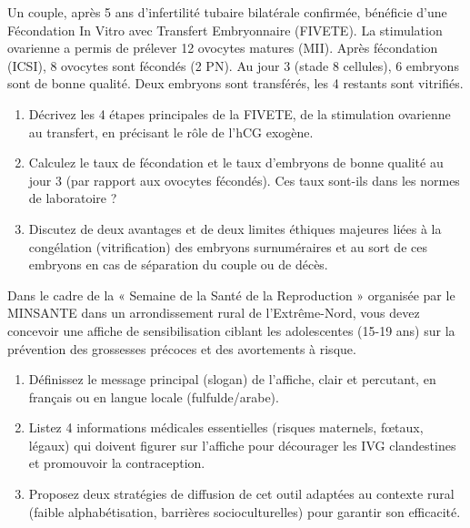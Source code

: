 \documentclass[11pt]{article}
\begin{document}
\begin{exercice}
Un couple, après 5 ans d'infertilité tubaire bilatérale confirmée, bénéficie d'une Fécondation In Vitro avec Transfert Embryonnaire (FIVETE). La stimulation ovarienne a permis de prélever 12 ovocytes matures (MII). Après fécondation (ICSI), 8 ovocytes sont fécondés (2 PN). Au jour 3 (stade 8 cellules), 6 embryons sont de bonne qualité. Deux embryons sont transférés, les 4 restants sont vitrifiés.
\begin{enumerate}
    \item Décrivez les 4 étapes principales de la FIVETE, de la stimulation ovarienne au transfert, en précisant le rôle de l'hCG exogène.
    \item Calculez le taux de fécondation et le taux d'embryons de bonne qualité au jour 3 (par rapport aux ovocytes fécondés). Ces taux sont-ils dans les normes de laboratoire ?
    \item Discutez de deux avantages et de deux limites éthiques majeures liées à la congélation (vitrification) des embryons surnuméraires et au sort de ces embryons en cas de séparation du couple ou de décès.
\end{enumerate}
\end{exercice}

\begin{exercice}
Dans le cadre de la « Semaine de la Santé de la Reproduction » organisée par le MINSANTE dans un arrondissement rural de l'Extrême-Nord, vous devez concevoir une affiche de sensibilisation ciblant les adolescentes (15-19 ans) sur la prévention des grossesses précoces et des avortements à risque.
\begin{enumerate}
    \item Définissez le message principal (slogan) de l'affiche, clair et percutant, en français ou en langue locale (fulfulde/arabe).
    \item Listez 4 informations médicales essentielles (risques maternels, fœtaux, légaux) qui doivent figurer sur l'affiche pour décourager les IVG clandestines et promouvoir la contraception.
    \item Proposez deux stratégies de diffusion de cet outil adaptées au contexte rural (faible alphabétisation, barrières socioculturelles) pour garantir son efficacité.
\end{enumerate}
\end{exercice}
\end{document}
